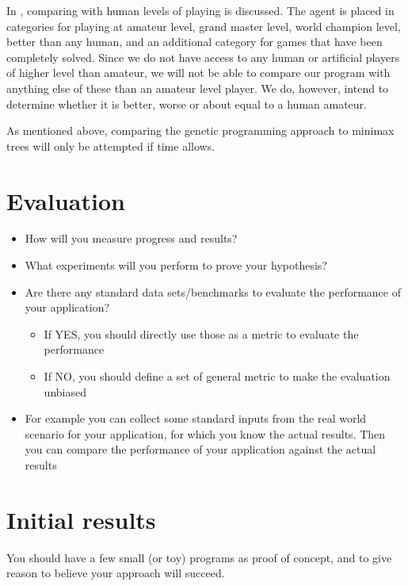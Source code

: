 \documentclass[times, 10pt,twocolumn]{article}
\begin{document}
In \cite{games_solved}, comparing with human levels of playing is discussed.  The agent is placed in categories for playing at amateur level, grand master level, world champion level, better than any human, and an additional category for games that have been completely solved. Since we do not have access to any human or artificial players of higher level than amateur, we will not be able to compare our program with anything else of these than an amateur level player. We do, however, intend to determine whether it is better, worse or about equal to a human amateur.

As mentioned above, comparing the genetic programming approach to minimax trees will only be attempted if time allows.

\section{Evaluation}

\begin{itemize}
	\item{How will you measure progress and results?}
	\item{What experiments will you perform to prove your hypothesis?}
	\item{Are there any standard data sets/benchmarks to evaluate the performance of your application?}
	\begin{itemize}
		\item{If YES, you should directly use those as a metric to evaluate the performance}
		\item{If NO, you should define a set of general metric to make the evaluation unbiased}
	\end{itemize}
	\item{For example you can collect some standard inputs from the real world scenario for your application, for which you know the actual results. Then you can compare the performance of your application against the actual results}
\end{itemize}

\section{Initial results}
You should have a few small (or toy) programs as proof of concept, and to give reason to believe your approach will succeed.
\end{document}
